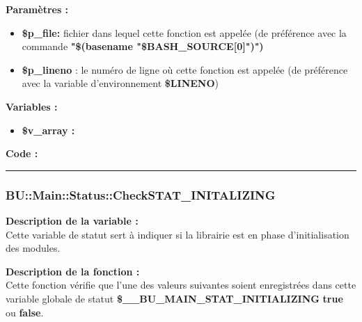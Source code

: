 \documentclass[a4paper,10pt]{article}
\begin{document}
\begin{justify}
    \textbf{Paramètres :}
    \begin{itemize}
        \item \textbf{\color{orange}\$p\_file\color{white}:} fichier dans lequel cette fonction est appelée (de préférence avec la commande \textbf{\textbf{"\$(\color{gray}basename \color{white}"\color{orange}\$BASH\_SOURCE[0]\color{white}")")}}\\

        \item \color{orange}\textbf{\$p\_lineno}\color{white} : le numéro de ligne où cette fonction est appelée (de préférence avec la variable d'environnement \textbf{\color{orange}\$LINENO})
    \end{itemize}
\end{justify}

\begin{justify}
    \textbf{Variables :}

    \begin{itemize}
        \item \textbf{\color{orange}\$v\_array\color{white} :}
    \end{itemize}
\end{justify}

\begin{justify}
    \textbf{Code :}
\end{justify}


\color{blue}\par\noindent\rule{\textwidth}{0.4pt}\color{white}

\color{blue}
\subsubsection{\color{mauve}BU::Main::Status::CheckSTAT\_INITALIZING}\color{white}

\begin{justify}
    \textbf{Description de la variable :}\\
    Cette variable de statut sert à indiquer si la librairie est en phase d'initialisation des modules.
\end{justify}

\begin{justify}
    \textbf{Description de la fonction :}\\
    Cette fonction vérifie que l'une des valeurs suivantes soient enregistrées dans cette variable globale de statut \textbf{\color{orange}\$\_\_BU\_MAIN\_STAT\_INITIALIZING} \textbf{true} ou \textbf{false}.
\end{justify}
\end{document}
